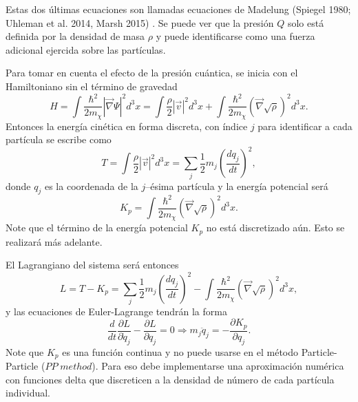 \documentclass[a4paper,openright,12pt]{book}
\begin{document}
Estas dos últimas ecuaciones son llamadas ecuaciones de Madelung (Spiegel 1980; Uhleman et al. 2014, Marsh 2015) \cite{3.2, 3.3, 3.4}. Se puede ver que la presión $Q$ solo está definida por la densidad de masa $\rho$ y puede identificarse como una fuerza adicional ejercida sobre las partículas.

Para tomar en cuenta el efecto de la presión cuántica, se inicia con el Hamiltoniano sin el término de gravedad
\begin{equation}
H = \int \frac{\hbar^{2}}{2 m_{\chi}} |\vec{\nabla}\Psi|^{2}d^{3}x
  = \int \frac{\rho}{2} |\vec{v}|^{2}d^{3}x + \int \frac{\hbar^{2}}{2 m_{\chi}} (\vec{\nabla}\sqrt{\rho})^{2}d^{3}x.\label{eqn 3.8}
\end{equation}
Entonces la energía cinética en forma discreta, con índice $j$ para identificar a cada partícula se escribe como
\begin{equation}
T = \int \frac{\rho}{2} |\vec{v}|^{2}d^{3}x = \sum_{j} \frac{1}{2} m_{j} \left(\frac{d q_{j}}{dt}\right)^{2}, \label{eqn 3.9}
\end{equation}
donde $q_{j}$ es la coordenada de la $j$--ésima partícula y la energía potencial será 
\begin{equation}
K_{p} = \int \frac{\hbar^{2}}{2 m_{\chi}} (\vec{\nabla}\sqrt{\rho})^{2}d^{3}x. \label{eqn 3.10}
\end{equation}
Note que el término de la energía potencial $K_{p}$ no está discretizado aún. Esto se realizará más adelante.

El Lagrangiano del sistema será entonces 
\begin{equation}
L = T - K_{p}
  =
\sum_{j} \frac{1}{2} m_{j} \left(\frac{d q_{j}}{dt}\right)^{2}
-
 \int \frac{\hbar^{2}}{2 m_{\chi}} (\vec{\nabla}\sqrt{\rho})^{2}d^{3}x,\label{eqn 3.11}  
\end{equation}
y las ecuaciones de Euler-Lagrange tendrán la forma
\begin{equation}
\frac{d}{dt}\frac{\partial L}{\partial \dot{q}_{j}} - \frac{\partial L }{\partial q_{j}} = 0 
\Rightarrow 
m_{j} \ddot{q}_{j} = - \frac{\partial K_{p}}{\partial q_{j}}.\label{eqn 3.12}
\end{equation}
Note que $K_{p}$ es una función continua y no puede usarse en el método Particle-Particle ($PP \; method$). Para eso debe implementarse una aproximación numérica con funciones delta que discreticen a la densidad de número de cada partícula individual.
\end{document}
